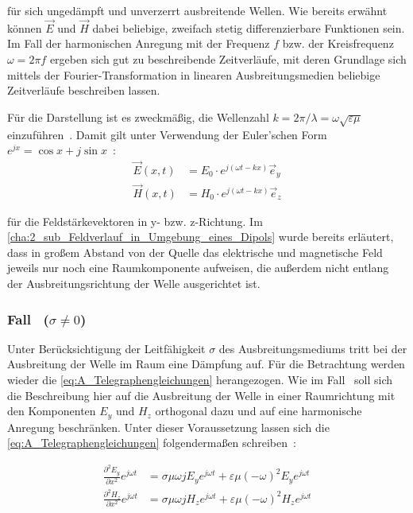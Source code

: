 für sich ungedämpft und unverzerrt ausbreitende Wellen. Wie bereits erwähnt können $\vec E$ und $\vec H$ dabei beliebige, zweifach stetig differenzierbare Funktionen sein. Im Fall der harmonischen Anregung mit der Frequenz $f$ bzw. der Kreisfrequenz $\omega = 2\pi f$ ergeben sich gut zu beschreibende Zeitverläufe, mit deren Grundlage sich mittels der Fourier-Transformation in linearen Ausbreitungsmedien beliebige Zeitverläufe beschreiben lassen. \par
Für die Darstellung ist es zweckmäßig, die Wellenzahl $k = 2\pi / \lambda = \omega \sqrt{\varepsilon \mu}$ einzuführen~\cite{EM_Schirmung}. Damit gilt unter Verwendung der Euler'schen Form $e^{jx} = \cos{x} + j \sin{x}$~\cite{Merzinger}:
\begin{subequations}
    \begin{align}
        \vec E(x,t) &= E_0 \cdot e^{j (\omega t - k x)} \vec e_y \\
        \vec H(x,t) &= H_0 \cdot e^{j (\omega t - k x)} \vec e_z
    \end{align}
    \label{eq:A_Wellengleichungen}
\end{subequations}

für die Feldstärkevektoren in y- bzw. z-Richtung. Im \Abschnitt \ref{cha:2_sub_Feldverlauf_in_Umgebung_eines_Dipols} wurde bereits erläutert, dass in großem Abstand von der Quelle das elektrische und magnetische Feld jeweils nur noch eine Raumkomponente aufweisen, die außerdem nicht entlang der Ausbreitungsrichtung der Welle ausgerichtet ist.


\subsubsection{Fall~ ($\sigma \neq 0$)}

Unter Berücksichtigung der Leitfähigkeit $\sigma$ des Ausbreitungsmediums tritt bei der Ausbreitung der Welle im Raum eine Dämpfung auf. Für die Betrachtung werden wieder die \Gleichungen \eqref{eq:A_Telegraphengleichungen} herangezogen. Wie im Fall~ soll sich die Beschreibung hier auf die Ausbreitung der Welle in einer Raumrichtung mit den Komponenten $E_y$ und $H_z$ orthogonal dazu und auf eine harmonische Anregung beschränken. Unter dieser Voraussetzung lassen sich die \Gleichungen \eqref{eq:A_Telegraphengleichungen} folgendermaßen schreiben~\cite{EM_Schirmung}:

\begin{subequations}
    \begin{align}
        \frac{\partial^2 E_y}{\partial x^2} e^{j\omega t} &= \sigma \mu \omega j E_y e^{j \omega t} + \varepsilon \mu (- \omega)^2 E_y e^{j \omega t} \\
        \frac{\partial^2 H_z}{\partial x^2} e^{j\omega t} &= \sigma \mu \omega j H_z e^{j \omega t} + \varepsilon \mu (- \omega)^2 H_z e^{j \omega t}
    \end{align}
\end{subequations}

